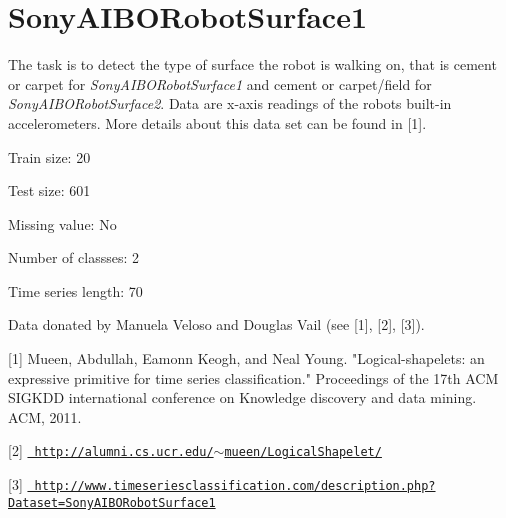 \chapter{Sony\+AIBORobot\+Surface1}
\hypertarget{md_external_2data_2UCRArchive__2018_2SonyAIBORobotSurface1_2README}{}\label{md_external_2data_2UCRArchive__2018_2SonyAIBORobotSurface1_2README}
\label{md_external_2data_2UCRArchive__2018_2SonyAIBORobotSurface1_2README_autotoc_md212}%
%
 The task is to detect the type of surface the robot is walking on, that is cement or carpet for {\itshape Sony\+AIBORobot\+Surface1} and cement or carpet/field for {\itshape Sony\+AIBORobot\+Surface2}. Data are x-\/axis readings of the robot\textquotesingle{}s built-\/in accelerometers. More details about this data set can be found in \mbox{[}1\mbox{]}.

Train size\+: 20

Test size\+: 601

Missing value\+: No

Number of classses\+: 2

Time series length\+: 70

Data donated by Manuela Veloso and Douglas Vail (see \mbox{[}1\mbox{]}, \mbox{[}2\mbox{]}, \mbox{[}3\mbox{]}).

\mbox{[}1\mbox{]} Mueen, Abdullah, Eamonn Keogh, and Neal Young. "{}\+Logical-\/shapelets\+: an expressive primitive for time series classification."{} Proceedings of the 17th ACM SIGKDD international conference on Knowledge discovery and data mining. ACM, 2011.

\mbox{[}2\mbox{]} \href{http://alumni.cs.ucr.edu/~mueen/LogicalShapelet/}{\texttt{ http\+://alumni.\+cs.\+ucr.\+edu/\texorpdfstring{$\sim$}{\string~}mueen/\+Logical\+Shapelet/}}

\mbox{[}3\mbox{]} \href{http://www.timeseriesclassification.com/description.php?Dataset=SonyAIBORobotSurface1}{\texttt{ http\+://www.\+timeseriesclassification.\+com/description.\+php?\+Dataset=\+Sony\+AIBORobot\+Surface1}} 